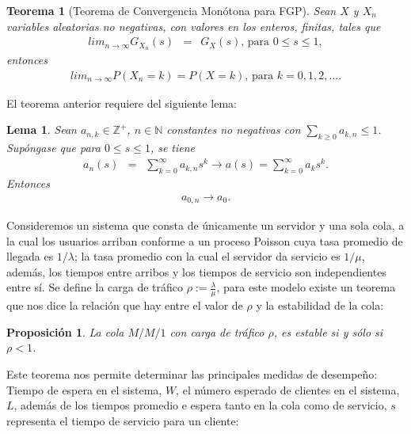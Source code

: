 \documentclass{article}
\newtheorem{Teo}{Teorema}[section]
\newtheorem{Prop}{Proposición}[section]
\newtheorem{Lema}{Lema}[section]
\newcommand{\nat}{\mathbb{N}}
\newcommand{\ent}{\mathbb{Z}}
\numberwithin{equation}{section}
\begin{document}
\begin{Teo}[Teorema de Convergencia Mon\'otona para FGP] Sean $X$ y $X_{n}$ variables aleatorias no negativas, con valores en los enteros, finitas, tales que
\begin{eqnarray*}
lim_{n\rightarrow\infty}G_{X_{n}}\left(s\right)&=&G_{X}\left(s\right)\textrm{, para }0\leq s\leq1,
\end{eqnarray*}
entonces
\begin{eqnarray*}
lim_{n\rightarrow\infty}P\left(X_{n}=k\right)=P\left(X=k\right)\textrm{, para }k=0,1,2,\ldots.
\end{eqnarray*}

\end{Teo}

El teorema anterior requiere del siguiente lema:
\begin{Lema}
Sean $a_{n,k}\in\ent^{+}$, $n\in\nat$ constantes no negativas con $\sum_{k\geq0}a_{k,n}\leq1$. Sup\'ongase que para $0\leq s\leq1$, se tiene
\begin{eqnarray}
a_{n}\left(s\right)&=&\sum_{k=0}^{\infty}a_{k,n}s^{k}\rightarrow
a\left(s\right)=\sum_{k=0}^{\infty}a_{k}s^{k}.
\end{eqnarray}
Entonces
\begin{eqnarray}
a_{0,n}\rightarrow a_{0}.
\end{eqnarray}
\end{Lema}

Consideremos un sistema que consta de \'unicamente un servidor y una sola cola, a la cual los usuarios arriban conforme a un proceso Poisson cuya tasa promedio de llegada es $1/\lambda$; la tasa promedio con la cual el servidor da servicio es $1/\mu$, adem\'as, los tiempos entre arribos y los tiempos de servicio son independientes entre s\'i. Se define la carga de tr\'afico $\rho:=\frac{\lambda}{\mu}$, para este modelo existe un teorema que nos dice la relaci\'on que hay entre el valor de $\rho$ y la estabilidad de la cola:

\begin{Prop}
La cola $M/M/1$ con carga de tr\'afico $\rho$, es estable si y s\'olo si $\rho<1$.
\end{Prop}

Este teorema nos permite determinar las principales medidas de desempe\~no: Tiempo de espera en el sistema, $W$, el n\'umero esperado de clientes en el sistema, $L$, adem\'as de los tiempos promedio e espera tanto en la cola como de servicio, $s$ representa el tiempo de servicio para un cliente:
\end{document}
